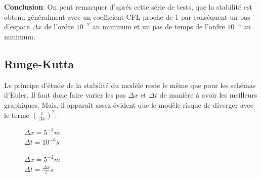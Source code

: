 \begin{enumerate}[label=\alph*)]
\textbf{Conclusion}: On peut remarquer d'aprés cette série de tests, que la stabilité est obtenu généralment avec un coefficient CFL proche de 1 par conséquent un pas d'espace $\Delta x$ de l'ordre ${10}^{-2}$ au minimum et un pas de temps de l'ordre ${10}^{-5}$ au minimum.   


\end{enumerate}

\subsection{Runge-Kutta}
Le principe d'étude de la stabilité du modèle reste le même que pour les schémas d'Euler. Il faut donc faire varier les pas $\Delta x$ et $\Delta t$ de manière à avoir les meilleurs graphiques.
Mais, il apparaît assez évident que le modèle risque de diverger avec le terme $(\frac{c}{\Delta x})^2$.\\

    
\begin{figure}[H]
\begin{minipage}[b]{.46\linewidth}
\centering{}
\caption{
        $\Delta x= 5^{-3}m $\\
        $\Delta t= 10^{-6}s$
    \label{fig1}
    }
\end{minipage} \hfill
\begin{minipage}[b]{.46\linewidth}
\centering{}
\caption{$\Delta x= 5^{-3}m $\\ 
        $\Delta t= 10^{-6}s$ \label{fig2}}
\end{minipage}
\end{figure}

\begin{figure}[H]
\begin{minipage}[b]{.46\linewidth}
\centering{}
\caption{$\Delta x= 5^{-2}m $\\ 
        $\Delta t= 10^{-7}s$\label{fig1}}
\end{minipage} \hfill
\begin{minipage}[b]{.46\linewidth}
\centering{}
\caption{$\Delta x= 5^{-2} m $\\ 
        $\Delta t= \frac{\Delta x}{c}s $ \label{fig2}}
\end{minipage}
\end{figure}


